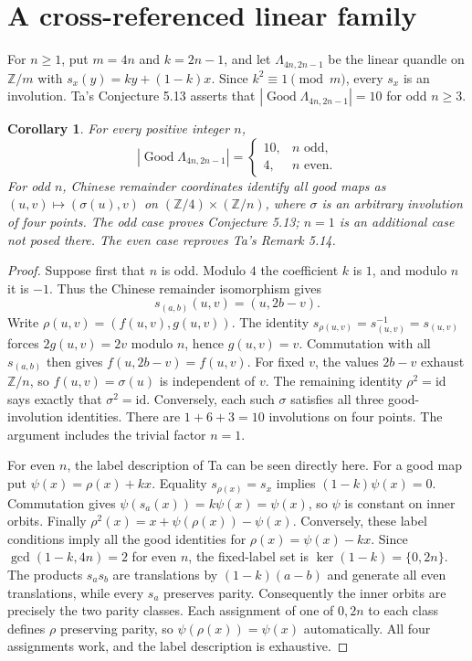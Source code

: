 \documentclass[11pt]{article}
\newtheorem{corollary}[theorem]{Corollary}
\newcommand{\Good}{\operatorname{Good}}
\begin{document}
\section{A cross-referenced linear family}
For $n\ge1$, put $m=4n$ and $k=2n-1$, and let
$\Lambda_{4n,2n-1}$ be the linear quandle on $\mathbb Z/m$ with
$s_x(y)=ky+(1-k)x$. Since $k^2\equiv1\pmod m$, every $s_x$
is an involution. Ta's Conjecture 5.13
\cite[Section 5.2.2, p.~17]{TaTwisted} asserts that
$|\Good\Lambda_{4n,2n-1}|=10$ for odd $n\ge3$.

\begin{corollary}\label{cor:linear}
For every positive integer $n$,
\[
 |\Good\Lambda_{4n,2n-1}|=
 \begin{cases}10,&n\text{ odd},\\4,&n\text{ even}.\end{cases}
\]
For odd $n$, Chinese remainder coordinates identify all good maps as
$(u,v)\mapsto(\sigma(u),v)$ on $(\mathbb Z/4)\times(\mathbb Z/n)$,
where $\sigma$ is an arbitrary involution of four points.
The odd case proves Conjecture 5.13; $n=1$ is an additional case not
posed there. The even case reproves Ta's Remark 5.14.
\end{corollary}
\begin{proof}
Suppose first that $n$ is odd. Modulo $4$ the coefficient $k$ is $1$,
and modulo $n$ it is $-1$. Thus the Chinese remainder isomorphism gives
\[
 s_{(a,b)}(u,v)=(u,2b-v).
\]
Write $\rho(u,v)=(f(u,v),g(u,v))$. The identity
$s_{\rho(u,v)}=s_{(u,v)}^{-1}=s_{(u,v)}$ forces $2g(u,v)=2v$
modulo $n$, hence $g(u,v)=v$. Commutation with all $s_{(a,b)}$
then gives $f(u,2b-v)=f(u,v)$. For fixed $v$, the values $2b-v$
exhaust $\mathbb Z/n$, so $f(u,v)=\sigma(u)$ is independent of $v$.
The remaining identity $\rho^2=\mathrm{id}$ says exactly that
$\sigma^2=\mathrm{id}$. Conversely, each such $\sigma$ satisfies
all three good-involution identities. There are $1+6+3=10$ involutions
on four points. The argument includes the trivial factor $n=1$.

For even $n$, the label description of Ta
\cite[Theorem 4.2]{TaTwisted} can be seen directly here.
For a good map put $\psi(x)=\rho(x)+kx$. Equality $s_{\rho(x)}=s_x$
implies $(1-k)\psi(x)=0$. Commutation gives
$\psi(s_a(x))=k\psi(x)=\psi(x)$, so $\psi$ is constant on inner
orbits. Finally $\rho^2(x)=x+\psi(\rho(x))-\psi(x)$.
Conversely, these label conditions imply all the good identities for
$\rho(x)=\psi(x)-kx$.
Since $\gcd(1-k,4n)=2$ for even $n$, the fixed-label set is
$\ker(1-k)=\{0,2n\}$. The products $s_a s_b$ are translations by
$(1-k)(a-b)$ and generate all even translations, while every $s_a$
preserves parity. Consequently the inner orbits are precisely the two
parity classes. Each assignment of one of $0,2n$ to each class defines
$\rho$ preserving parity, so $\psi(\rho(x))=\psi(x)$ automatically.
All four assignments work, and the label description is exhaustive.
\end{proof}
\end{document}
